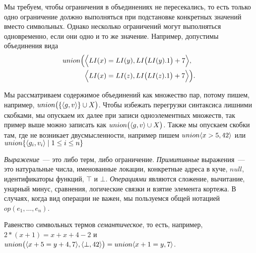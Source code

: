 \begin{remk*}
Мы требуем, чтобы ограничения в объединениях не пересекались, то есть только одно ограничение должно выполняться при подстановке конкретных значений вместо символьных. Однако несколько ограничений могут выполняться одновременно, если они  одно и то же значение. Например, допустимы объединения вида
\begin{align*}
    union\Big(&\Big\langle LI(x)=LI(y), LI\big(LI(y).1\big) + 7\Big\rangle,\\ &\Big\langle LI(x)=LI(z), LI\big(LI(z).1\big) + 7\Big\rangle\Big).
\end{align*}

Мы рассматриваем содержимое объединений как множество пар, потому пишем, например, $union\big(\{\langle g, v\rangle\}\cup X\big)$. Чтобы избежать перегрузки синтаксиса лишними скобками, мы опускаем их далее при записи одноэлементных множеств, так пример выше можно записать как $union\big(\langle g, v\rangle\cup X\big)$. Также мы опускаем скобки там, где не возникает двусмысленности, например пишем $union\langle x>5, 42\rangle$ или $union\{\langle g_i, v_i\rangle\mid 1 \le i \le n\}$
\end{remk*}

\emph{Выражение}~--- это либо терм, либо ограничение. \emph{Примитивные} выражения~--- это натуральные числа, именованные локации, конкретные адреса в куче, $null$, идентификаторы функций, $\top$ и $\bot$. \emph{Операциями} являются сложение, вычитание, унарный минус, сравнения, логические связки и взятие элемента кортежа. В случаях, когда вид операции не важен, мы пользуемся общей нотацией $op(e_1, \ldots, e_n)$.

\begin{remk*}
Равенство символьных термов \emph{семантическое}, то есть, например, $2 * (x + 1) = x + x + 4 - 2$ и $union\big(\langle x+5=y+4, 7\rangle,\langle\bot, 42\rangle\big)=union{\langle x+1=y, 7\rangle}$.
\end{remk*}


